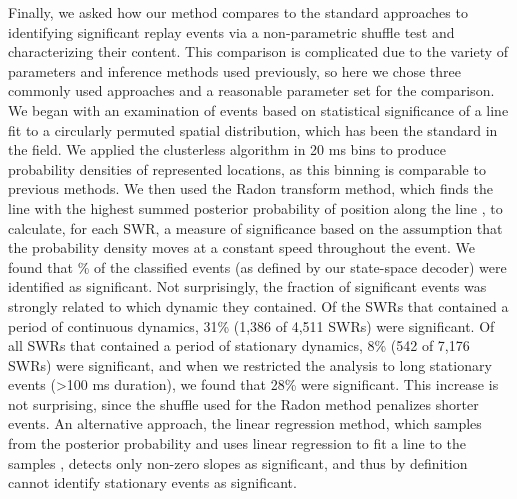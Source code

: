 \documentclass[9pt,lineno]{elife}
\begin{document}
Finally, we asked how our method compares to the standard approaches to identifying significant replay events via a non-parametric shuffle test and characterizing their content. This comparison is complicated due to the variety of parameters and inference methods used previously, so here we chose three commonly used approaches and a reasonable parameter set for the comparison. We began with an examination of events based on statistical significance of a line fit to a circularly permuted spatial distribution, which has been the standard in the field.  We applied the clusterless algorithm in 20 ms bins to produce probability densities of represented locations, as this binning is comparable to previous methods. We then used the Radon transform method, which finds the line with the highest summed posterior probability of position along the line \citep{DavidsonHippocampalReplayExtended2009, FarooqEmergencepreconfiguredplastic2019}, to calculate, for each SWR, a measure of significance based on the assumption that the probability density moves at a constant speed throughout the event. We found that \% of the classified events (as defined by our state-space decoder) were identified as significant. Not surprisingly, the fraction of significant events was strongly related to which dynamic they contained. Of the SWRs that contained a period of continuous dynamics, 31\% (1,386 of 4,511 SWRs) were significant. Of all SWRs that contained a period of stationary dynamics, 8\% (542 of 7,176 SWRs) were significant, and when we restricted the analysis to long stationary events (>100 ms duration), we found that 28\% were significant. This increase is not surprising, since the shuffle used for the Radon method penalizes shorter events. An alternative approach, the linear regression method, which samples from the posterior probability and uses linear regression to fit a line to the samples \citep{KarlssonAwakereplayremote2009, CarrHippocampalreplayawake2011, ShinDynamicsAwakeHippocampalPrefrontal2019}, detects only non-zero slopes as significant, and thus by definition cannot identify stationary events as significant. 
\end{document}
